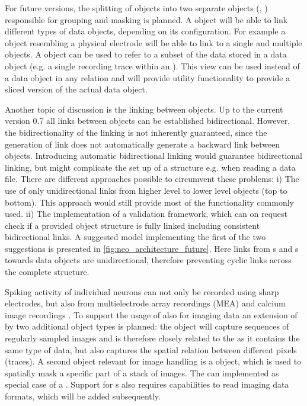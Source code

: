 For future versions, the splitting of  objects into two separate objects (, ) responsible for grouping and masking is planned. A  object will be able to link different types of data objects, depending on its configuration. For example a  object resembling a physical electrode will be able to link to a single  and multiple  objects. A  object can be used to refer to a subset of the data stored in a data object (e.g. a single recording trace within an ). This view can be used instead of a data object in any relation and will provide utility functionality to provide a sliced version of the actual data object.

Another topic of discussion is the linking between  objects. Up to the current version 0.7 all links between  objects can be established bidirectional. However, the bidirectionality of the linking is not inherently guaranteed, since the generation of link does not automatically generate a backward link between  objects. Introducing automatic bidirectional linking would guarantee bidirectional linking, but might complicate the set up of a  structure e.g. when reading a data file. There are different approaches possible to circumvent these problems: i) The use of only unidirectional links from higher level to lower level objects (top to bottom). This approach would still provide most of the functionality commonly used. ii) The implementation of a validation framework, which can on request check if a provided  object structure is fully linked including consistent bidirectional links. A suggested model implementing the first of the two suggestions is presented in \cref{fig:neo_architecture_future}. Here links from s and s towards data objects are unidirectional, therefore preventing cyclic links across the complete  structure.

Spiking activity of individual neurons can not only be recorded using sharp electrodes, but also  from multielectrode array recordings (MEA) and calcium image recordings \citep{Kelly_2007, Shew_2010}. To support the usage of  also for imaging data an extension of  by two additional object types is planned: the  object will capture sequences of regularly sampled images and is therefore closely related to the  as it contains the same type of data, but also captures the spatial relation between different pixels (traces). A second object relevant for image handling is a  object, which is used to spatially mask a specific part of a stack of images. The  can implemented as special case of a . Support for s also requires capabilities to read imaging data formats, which will be added subsequently.


